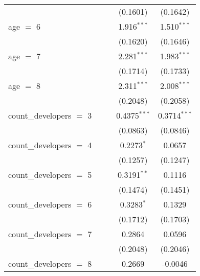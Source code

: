 \begin{tabular}{lcccc}
                                        &                &                & (0.1601)       & (0.1642)\\   
   age $=$ 6                            &                &                & 1.916$^{***}$  & 1.510$^{***}$\\   
                                        &                &                & (0.1620)       & (0.1646)\\   
   age $=$ 7                            &                &                & 2.281$^{***}$  & 1.983$^{***}$\\   
                                        &                &                & (0.1714)       & (0.1733)\\   
   age $=$ 8                            &                &                & 2.311$^{***}$  & 2.008$^{***}$\\   
                                        &                &                & (0.2048)       & (0.2058)\\   
   count\_developers $=$ 3              &                &                & 0.4375$^{***}$ & 0.3714$^{***}$\\   
                                        &                &                & (0.0863)       & (0.0846)\\   
   count\_developers $=$ 4              &                &                & 0.2273$^{*}$   & 0.0657\\   
                                        &                &                & (0.1257)       & (0.1247)\\   
   count\_developers $=$ 5              &                &                & 0.3191$^{**}$  & 0.1116\\   
                                        &                &                & (0.1474)       & (0.1451)\\   
   count\_developers $=$ 6              &                &                & 0.3283$^{*}$   & 0.1329\\   
                                        &                &                & (0.1712)       & (0.1703)\\   
   count\_developers $=$ 7              &                &                & 0.2864         & 0.0596\\   
                                        &                &                & (0.2048)       & (0.2046)\\   
   count\_developers $=$ 8              &                &                & 0.2669         & -0.0046\\   

\end{tabular}
